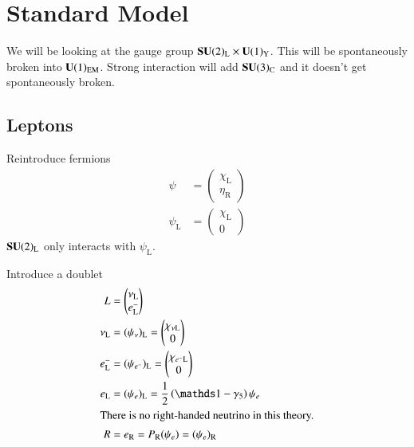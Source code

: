 \chapter{Standard Model}
We will be looking at the gauge group $\mathbf{SU}(2)_\text{L} \times \mathbf{U}(1)_\text{Y}$. This will be spontaneously broken into $\mathbf{U}(1)_{\text{EM}}$. Strong interaction will add $\mathbf{SU}(3)_\text{C}$ and it doesn't get spontaneously broken.

\section{Leptons}
Reintroduce fermions
\begin{align}
   \psi &= \begin{pmatrix} \chi_\text{L} \\ \eta_\text{R} \end{pmatrix} \\
   \psi_\text{L} &= \begin{pmatrix} \chi_\text{L} \\ 0 \end{pmatrix}
\end{align}
$\mathbf{SU}(2)_\text{L}$ only interacts with $\psi_\text{L}$.

Introduce a doublet
\begin{align}
   L &= \begin{pmatrix} \nu_\text{L} \\ e^-_\text{L} \end{pmatrix} \\
   \nu_\text{L} &= (\psi_\nu)_\text{L} =  \begin{pmatrix} \chi_{\nu \text{L}} \\ 0 \end{pmatrix}    \\
   e_\text{L}^- &= (\psi_{e^-})_\text{L} = \begin{pmatrix} \chi_{e^- \text{L}} \\ 0 \end{pmatrix} \\
   e_\text{L} &= (\psi_e)_\text{L} = \frac{1}{2} \left( \id - \gamma_5 \right) \psi_e \\
   \shortintertext{There is no right-handed neutrino in this theory.}
   R &= e_\text{R} = P_\text{R} (\psi_e) = (\psi_e)_\text{R}
\end{align}

